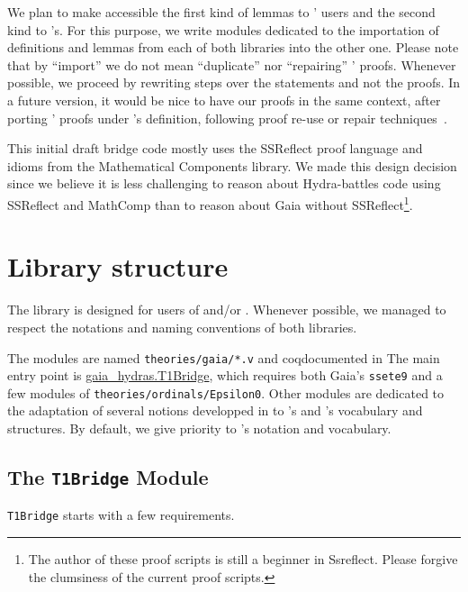   We plan to make accessible the first kind of lemmas to \HydrasLib' users and the second kind to \gaia's. For this purpose, we write modules dedicated to the importation of definitions and lemmas from each of both libraries into the other one.
  Please note that by ``import'' we do not mean ``duplicate''
  nor ``repairing'' \HydrasLib' proofs.  Whenever possible, we proceed by rewriting steps over the statements and not the proofs. In a future version, it would be nice to have our proofs in the same context, after porting \HydrasLib' proofs under \gaia's
  definition, following  proof re-use or repair  techniques~\cite{Barthe2001, Magaud03a, ringer2021}.



This initial draft bridge code mostly uses the SSReflect proof language
and idioms from the Mathematical Components library. We made this design
decision since we believe it is less challenging to reason about
Hydra-battles code using SSReflect and MathComp than to reason about
Gaia without SSReflect\footnote{The author of these proof scripts is still a beginner in Ssreflect. Please forgive the clumsiness of the current proof scripts.}.

\section{Library structure}
The \gaiaHydras library is designed for users of
\gaia and/or  \HydrasLib. Whenever possible, we managed to respect the notations and naming conventions of both libraries.

The modules are named {\texttt{theories/gaia/*.v}} and coqdocumented in 
The main entry point is
\href{../theories/html/gaia_hydras.T1Bridge.html}{gaia\_hydras.T1Bridge}, which requires both Gaia's \texttt{ssete9} and a few modules of \texttt{theories/ordinals/Epsilon0}.
Other modules are dedicated to the adaptation of several notions developped in \HydrasLib to \mathcomp's and \gaia's vocabulary and structures.
By default, we give priority to \gaia's notation and vocabulary.


\subsection{The \texttt{T1Bridge} Module}

\texttt{T1Bridge} starts with a few requirements.

